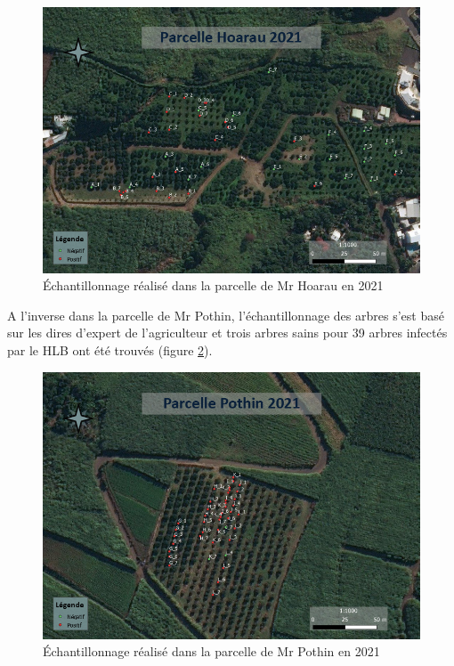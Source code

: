 \documentclass[
  11pt,
  french,
  a4paper,
  extrafontsizes,onecolumn,openright
  ]{memoir}
\begin{document}
\begin{figure}

{\centering \includegraphics[width=0.8\linewidth]{Images/Figure3} 

}

\caption{Échantillonnage réalisé dans la parcelle de Mr Hoarau en 2021}\label{fig:3}
\end{figure}

\normalsize

A l'inverse dans la parcelle de Mr Pothin, l'échantillonnage des arbres s'est basé sur les dires d'expert de l'agriculteur et trois arbres sains pour 39 arbres infectés par le HLB ont été trouvés (figure \ref{fig:4}).

\scriptsize

\begin{figure}

{\centering \includegraphics[width=0.8\linewidth]{Images/Figure4} 

}

\caption{Échantillonnage réalisé dans la parcelle de Mr Pothin en 2021}\label{fig:4}
\end{figure}
\end{document}
